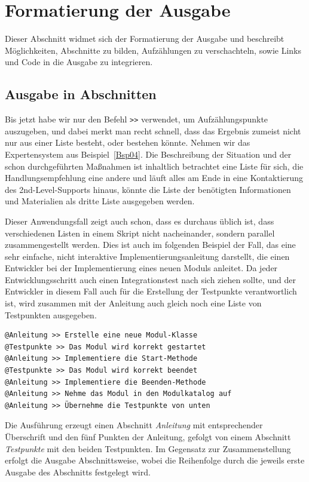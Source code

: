 \chapter{Formatierung der Ausgabe}\label{FormatierungAusgabe}
Dieser Abschnitt widmet sich der Formatierung der Ausgabe und beschreibt Möglichkeiten, Abschnitte zu bilden, Aufzählungen zu verschachteln, sowie Links und Code in die Ausgabe zu integrieren. 

\section{Ausgabe in Abschnitten}\label{Abschnitte}
Bis jetzt habe wir nur den Befehl \verb|>>| verwendet, um Aufzählungspunkte auszugeben, und dabei merkt man recht schnell, dass das Ergebnis zumeist nicht nur aus einer Liste besteht, oder bestehen könnte. Nehmen wir das Expertensystem aus Beispiel~\ref{Bsp04}. Die Beschreibung der Situation und der schon durchgeführten Maßnahmen ist inhaltlich betrachtet eine Liste für sich, die Handlungsempfehlung eine andere und läuft alles am Ende in eine Kontaktierung des 2nd-Level-Supports hinaus, könnte die Liste der benötigten Informationen und Materialien als dritte Liste ausgegeben werden.

Dieser Anwendungsfall zeigt auch schon, dass es durchaus üblich ist, dass verschiedenen Listen in einem Skript nicht nacheinander, sondern parallel zusammengestellt werden. Dies ist auch im folgenden Beispiel der Fall, das eine sehr einfache, nicht interaktive Implementierungsanleitung darstellt, die einen Entwickler bei der Implementierung eines neuen Moduls anleitet. Da jeder Entwicklungsschritt auch einen Integrationstest nach sich ziehen sollte, und der Entwickler in diesem Fall auch für die Erstellung der Testpunkte verantwortlich ist, wird zusammen mit der Anleitung auch gleich noch eine Liste von Testpunkten ausgegeben.

\begin{verbatim}
@Anleitung >> Erstelle eine neue Modul-Klasse
@Testpunkte >> Das Modul wird korrekt gestartet
@Anleitung >> Implementiere die Start-Methode
@Testpunkte >> Das Modul wird korrekt beendet
@Anleitung >> Implementiere die Beenden-Methode
@Anleitung >> Nehme das Modul in den Modulkatalog auf
@Anleitung >> Übernehme die Testpunkte von unten
\end{verbatim}

Die Ausführung erzeugt einen Abschnitt \emph{Anleitung} mit entsprechender Überschrift und den fünf Punkten der Anleitung, gefolgt von einem Abschnitt \emph{Testpunkte} mit den beiden Testpunkten. Im Gegensatz zur Zusammenstellung erfolgt die Ausgabe Abschnittsweise, wobei die Reihenfolge durch die jeweils erste Ausgabe des Abschnitts festgelegt wird.

